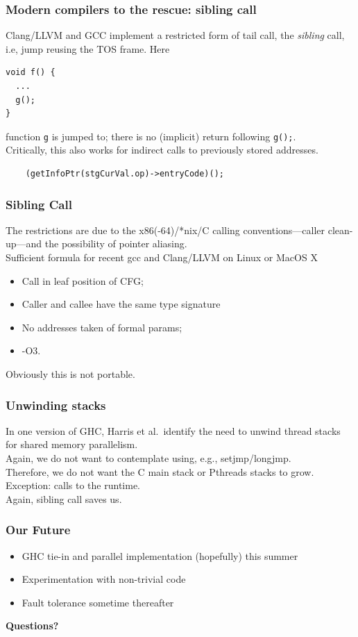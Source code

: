 \documentclass{beamer}
\begin{document}
\begin{frame}[fragile]
\frametitle{Modern compilers to the rescue:  sibling call}
Clang/LLVM and GCC implement a restricted form of tail call, the \emph{sibling}
call, i.e, jump reusing the TOS frame.  Here
\begin{verbatim}
void f() {
  ...
  g();
}
\end{verbatim}
function \texttt{g} is jumped to; there is no (implicit) return following
\texttt{g();}.  
\\\vspace{0.1in}
Critically, this also works for indirect calls to previously stored addresses.
\begin{verbatim}
    (getInfoPtr(stgCurVal.op)->entryCode)();
\end{verbatim}

\end{frame}

\begin{frame}
\frametitle{Sibling Call}
The restrictions are due to the x86(-64)/*nix/C calling
conventions---caller clean-up---and the possibility of pointer aliasing.
\\\vspace{0.1in}
Sufficient formula for recent gcc and Clang/LLVM on Linux or MacOS X
\begin{itemize}
\item Call in leaf position of CFG;
\item Caller and callee have the same type signature
\item No addresses taken of formal params;
\item -O3.
\end{itemize}
Obviously this is not portable.
\end{frame}


\begin{frame}
\frametitle{Unwinding stacks}
In one version of GHC, Harris et al.\ identify the need to unwind thread stacks for shared
memory parallelism.
\\\vspace{0.1in}
Again, we do not want to contemplate using, e.g., setjmp/longjmp.
\\\vspace{0.1in}
Therefore, we do not want the C main stack or Pthreads stacks to grow.
\\\vspace{0.1in}
Exception:  calls to the runtime.
\\\vspace{0.1in}
Again, sibling call saves us.
\end{frame}


\begin{frame}
  \frametitle{Our Future}
  
  \begin{itemize}
  \item<1-> GHC tie-in and parallel implementation (hopefully) this summer
  \item<2-> Experimentation with non-trivial code
  \item<3-> Fault tolerance sometime thereafter
  \end{itemize}
  
  \textbf{Questions?}
\end{frame}
\end{document}
